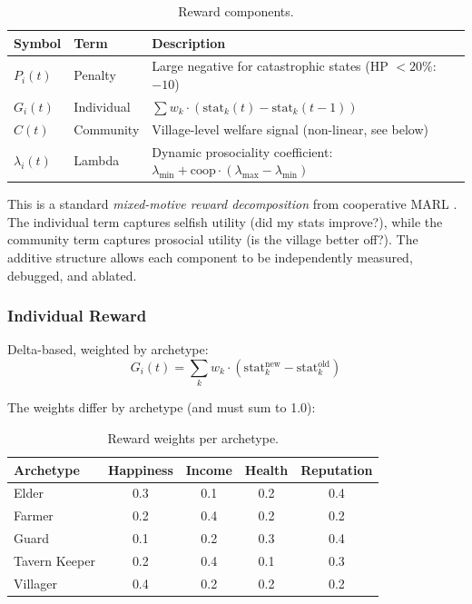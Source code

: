 \begin{table}[ht]
\centering
\caption{Reward components.}
\label{tab:reward_components}
\begin{tabular}{@{}lll@{}}
\toprule
Symbol & Term & Description \\
\midrule
$P_i(t)$ & Penalty & Large negative for catastrophic states (HP $< 20\%$: $-10$) \\
$G_i(t)$ & Individual & $\sum w_k \cdot (\text{stat}_k(t) - \text{stat}_k(t-1))$ \\
$C(t)$ & Community & Village-level welfare signal (non-linear, see below) \\
$\lambda_i(t)$ & Lambda & Dynamic prosociality coefficient: $\lambda_{\min} + \text{coop} \cdot (\lambda_{\max} - \lambda_{\min})$ \\
\bottomrule
\end{tabular}
\end{table}

This is a standard \emph{mixed-motive reward decomposition} from cooperative MARL \cite{lowe2017maddpg, rashid2018qmix}. The individual term captures selfish utility (did my stats improve?), while the community term captures prosocial utility (is the village better off?). The additive structure allows each component to be independently measured, debugged, and ablated.

\subsubsection{Individual Reward}

Delta-based, weighted by archetype:
$$G_i(t) = \sum_{k} w_k \cdot \left( \text{stat}_k^{\text{new}} - \text{stat}_k^{\text{old}} \right)$$

The weights differ by archetype (and must sum to 1.0):

\begin{table}[ht]
\centering
\caption{Reward weights per archetype.}
\label{tab:weights}
\begin{tabular}{@{}lcccc@{}}
\toprule
Archetype & Happiness & Income & Health & Reputation \\
\midrule
Elder & 0.3 & 0.1 & 0.2 & 0.4 \\
Farmer & 0.2 & 0.4 & 0.2 & 0.2 \\
Guard & 0.1 & 0.2 & 0.3 & 0.4 \\
Tavern Keeper & 0.2 & 0.4 & 0.1 & 0.3 \\
Villager & 0.4 & 0.2 & 0.2 & 0.2 \\
\bottomrule
\end{tabular}
\end{table}

